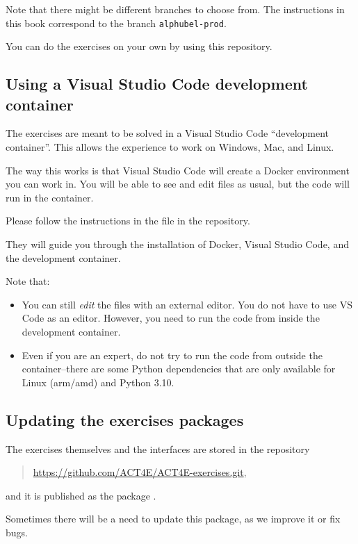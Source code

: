 Note that there might be different branches to choose from.
The instructions in this book correspond to the branch \texttt{alphubel-prod}.

You can do the exercises on your own by using this repository.
%

\subsection{Using a Visual Studio Code development container}

The exercises are meant to be solved in a Visual Studio Code ``development container''.
This allows the experience to work on Windows, Mac, and Linux.

The way this works is that Visual Studio Code will create a Docker environment you can work in.
You will be able to see and edit files as usual, but the code will run in the container.

Please follow the instructions in the  file in the repository.

They will guide you through the installation of Docker, Visual Studio Code, and the development container.

Note that:

\begin{itemize}
    \item You can still \emph{edit} the files with an external editor.
          You do not have to use VS Code as an editor.
          However, you need to run the code from inside the development container.
    \item Even if you are an expert, do not try to run the code from outside the container--there are some Python dependencies that are only available for Linux (arm/amd) and Python 3.10.
\end{itemize}

\subsection{Updating the exercises packages}

The exercises themselves and the interfaces are stored in the repository
\begin{quote}
    \url{https://github.com/ACT4E/ACT4E-exercises.git},
\end{quote}
and it is published as the package .

Sometimes there will be a need to update this package, as we improve it or fix bugs.

